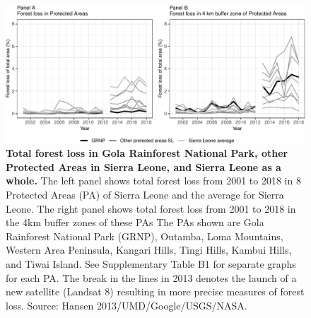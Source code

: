 \documentclass[
]{article}
\begin{document}
\begin{figure}[H]

{\centering \includegraphics[width=6in]{paper_REDD_replication_files/figure-latex/figForestlossBuffer-1} 

}

\caption{\textbf{Total forest loss in Gola Rainforest National Park, other Protected Areas in Sierra Leone, and Sierra Leone as a whole.} The left panel shows total forest loss from 2001 to 2018 in 8 Protected Areas (PA) of Sierra Leone and the average for Sierra Leone. The right panel shows total forest loss from 2001 to 2018 in the 4km buffer zones of these PAs The PAs shown are Gola Rainforest National Park (GRNP), Outamba, Loma Mountains, Western Area Peninsula, Kangari Hills, Tingi Hills, Kambui Hills, and Tiwai Island. See Supplementary Table B1 for separate graphs for each PA. The break in the lines in 2013 denotes the launch of a new satellite (Landsat 8) resulting in more precise measures of forest loss. Source: Hansen 2013/UMD/Google/USGS/NASA.}\label{fig:figForestlossBuffer}
\end{figure}
\end{document}
